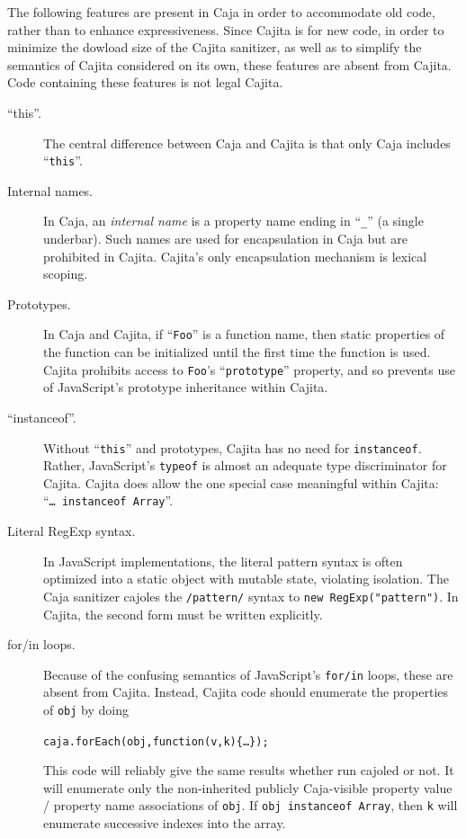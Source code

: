 \documentclass[letterpaper,twocolumn,10pt]{article}
\newcommand{\code}[1]{{\tt {#1}}}              %
\begin{document}
The following features are present in Caja in order to accommodate old code, 
rather than to enhance expressiveness. Since Cajita is for new code, in order 
to minimize the dowload size of the Cajita sanitizer, as well as to simplify 
the semantics of Cajita considered on its own, these features are absent from 
Cajita. Code containing these features is not legal Cajita.

\begin{description}
    
    \item[``this''.] The central difference between Caja and Cajita is that 
    only Caja includes ``\code{this}''.
    
    \item[Internal names.] In Caja, an \emph{internal name} is a property 
    name ending in ``\code{\_}'' (a single underbar). Such names are used for 
    encapsulation in Caja but are prohibited in Cajita. Cajita's only 
    encapsulation mechanism is lexical scoping.
    
    \item[Prototypes.] In Caja and Cajita, if ``\code{Foo}'' is a function 
    name, then static properties of the function can be initialized until the 
    first time the function is used. Cajita prohibits access to \code{Foo}'s 
    ``\code{prototype}'' property, and so prevents use of JavaScript's 
    prototype inheritance within Cajita.
    
    \item[``instanceof''.] Without ``\code{this}'' and prototypes, Cajita has 
    no need for \code{instanceof}. Rather, JavaScript's \code{typeof} is 
    almost an adequate type discriminator for Cajita. Cajita does allow the 
    one special case meaningful within Cajita: ``\code{{\ldots}\ instanceof 
    Array}''.
    
    \item[Literal RegExp syntax.] In JavaScript implementations, the literal 
    pattern syntax is often optimized into a static object with mutable 
    state, violating isolation. The Caja sanitizer cajoles the 
    \code{/pattern/} syntax to \code{new RegExp("pattern")}. In Cajita, the 
    second form must be written explicitly.
    
    \item[for/in loops.] Because of the confusing semantics of JavaScript's 
    \code{for/in} loops, these are absent from Cajita. Instead, Cajita code 
    should enumerate the properties of \code{obj} by doing
%
\begin{alltt}
caja.forEach(obj,function(v,k)\{{\ldots}\});
\end{alltt}
%
    This code will reliably give the same results whether run cajoled or not. 
    It will enumerate only the non-inherited publicly Caja-visible property 
    value / property name associations of \code{obj}. If \code{obj instanceof 
    Array}, then \code{k} will enumerate successive indexes into the array.
    

\end{description}
\end{document}
